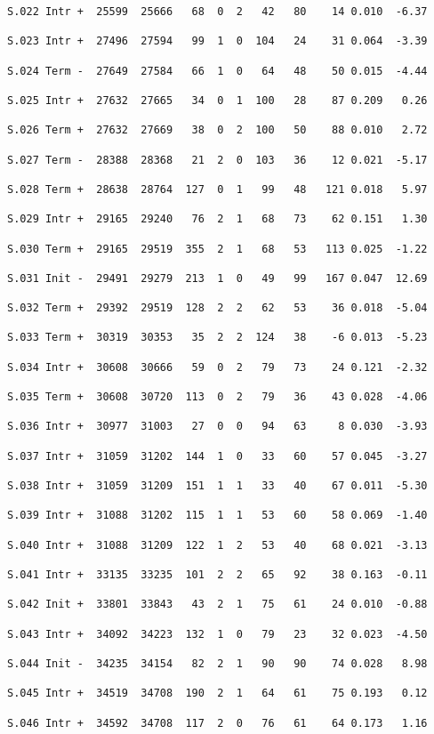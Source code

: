 \documentclass[en,black,10pt,normal]{elegantnote}
\begin{document}
\begin{lstlisting}[frame=single]
S.022 Intr +  25599  25666   68  0  2   42   80    14 0.010  -6.37

S.023 Intr +  27496  27594   99  1  0  104   24    31 0.064  -3.39

S.024 Term -  27649  27584   66  1  0   64   48    50 0.015  -4.44

S.025 Intr +  27632  27665   34  0  1  100   28    87 0.209   0.26

S.026 Term +  27632  27669   38  0  2  100   50    88 0.010   2.72

S.027 Term -  28388  28368   21  2  0  103   36    12 0.021  -5.17

S.028 Term +  28638  28764  127  0  1   99   48   121 0.018   5.97

S.029 Intr +  29165  29240   76  2  1   68   73    62 0.151   1.30

S.030 Term +  29165  29519  355  2  1   68   53   113 0.025  -1.22

S.031 Init -  29491  29279  213  1  0   49   99   167 0.047  12.69

S.032 Term +  29392  29519  128  2  2   62   53    36 0.018  -5.04

S.033 Term +  30319  30353   35  2  2  124   38    -6 0.013  -5.23

S.034 Intr +  30608  30666   59  0  2   79   73    24 0.121  -2.32

S.035 Term +  30608  30720  113  0  2   79   36    43 0.028  -4.06

S.036 Intr +  30977  31003   27  0  0   94   63     8 0.030  -3.93

S.037 Intr +  31059  31202  144  1  0   33   60    57 0.045  -3.27

S.038 Intr +  31059  31209  151  1  1   33   40    67 0.011  -5.30

S.039 Intr +  31088  31202  115  1  1   53   60    58 0.069  -1.40

S.040 Intr +  31088  31209  122  1  2   53   40    68 0.021  -3.13

S.041 Intr +  33135  33235  101  2  2   65   92    38 0.163  -0.11

S.042 Init +  33801  33843   43  2  1   75   61    24 0.010  -0.88

S.043 Intr +  34092  34223  132  1  0   79   23    32 0.023  -4.50

S.044 Init -  34235  34154   82  2  1   90   90    74 0.028   8.98

S.045 Intr +  34519  34708  190  2  1   64   61    75 0.193   0.12

S.046 Intr +  34592  34708  117  2  0   76   61    64 0.173   1.16


\end{lstlisting}
\end{document}
